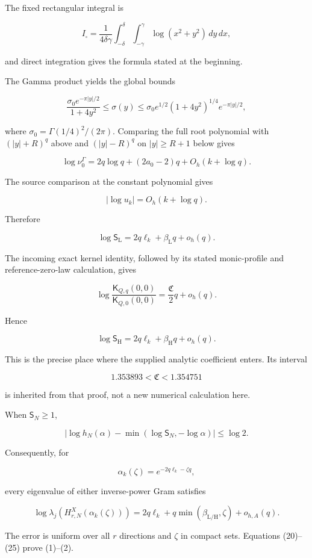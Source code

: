\documentclass[11pt]{article}
\begin{document}
The fixed rectangular integral is

\[
I_\square=
\frac1{4\delta\gamma}
\int_{-\delta}^{\delta}\int_{-\gamma}^{\gamma}
\log(x^2+y^2)\,dy\,dx,
\]

and direct integration gives the formula stated at the beginning.

The Gamma product yields the global bounds

\[
\frac{\sigma_0e^{-\pi|y|/2}}{1+4y^2}
\le\sigma(y)
\le
\sigma_0e^{1/2}(1+4y^2)^{1/4}e^{-\pi|y|/2},
\]

where \(\sigma_0=\Gamma(1/4)^2/(2\pi)\). Comparing the full root polynomial with \((|y|+R)^q\) above and \((|y|-R)^q\) on \(|y|\ge R+1\) below gives

\[
\log\nu_0^\Gamma
=
2q\log q+(2a_0-2)q+O_h(k+\log q).
\]

The source comparison at the constant polynomial gives

\[
|\log u_k|=O_h(k+\log q).
\]

Therefore

\[
\boxed{
\log\mathsf S_{\mathrm L}
=
2q\ell_k+\beta_{\mathrm L}q+o_h(q).
}
\tag{23}
\]

The incoming exact kernel identity, followed by its stated monic-profile and reference-zero-law calculation, gives

\[
\log\frac{\mathsf K_{Q,q}(0,0)}
{\mathsf K_{Q,0}(0,0)}
=
\frac{\mathfrak C}{2}q+o_h(q).
\]

Hence

\[
\boxed{
\log\mathsf S_{\mathrm H}
=
2q\ell_k+\beta_{\mathrm H}q+o_h(q).
}
\tag{24}
\]

This is the precise place where the supplied analytic coefficient enters. Its interval

\[
1.353893<\mathfrak C<1.354751
\]

is inherited from that proof, not a new numerical calculation here.

When \(\mathsf S_N\ge1\),

\[
\left|
\log h_N(\alpha)
-\min(\log\mathsf S_N,-\log\alpha)
\right|\le\log2.
\]

Consequently, for

\[
\alpha_k(\zeta)=e^{-2q\ell_k-\zeta q},
\]

every eigenvalue of either inverse-power Gram satisfies

\[
\boxed{
\log\lambda_j(H^X_{r,N}(\alpha_k(\zeta)))
=
2q\ell_k+
q\min(\beta_{\mathrm L/\mathrm H},\zeta)
+o_{h,A}(q).
}
\tag{25}
\]

The error is uniform over all \(r\) directions and \(\zeta\) in compact sets. Equations (20)--(25) prove (1)--(2).
\end{document}
